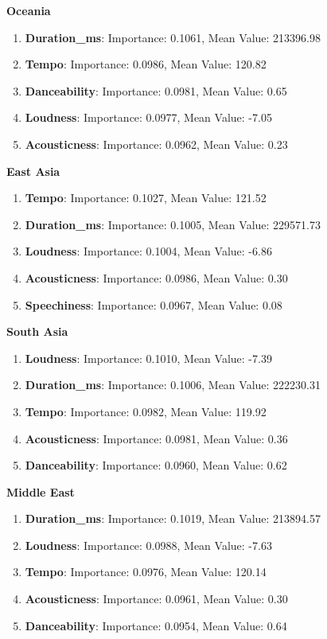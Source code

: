 \textbf{Oceania}
\begin{enumerate}
    \item \textbf{Duration\_ms}: Importance: 0.1061, Mean Value: 213396.98
    \item \textbf{Tempo}: Importance: 0.0986, Mean Value: 120.82
    \item \textbf{Danceability}: Importance: 0.0981, Mean Value: 0.65
    \item \textbf{Loudness}: Importance: 0.0977, Mean Value: -7.05
    \item \textbf{Acousticness}: Importance: 0.0962, Mean Value: 0.23
\end{enumerate}

\textbf{East Asia}
\begin{enumerate}
    \item \textbf{Tempo}: Importance: 0.1027, Mean Value: 121.52
    \item \textbf{Duration\_ms}: Importance: 0.1005, Mean Value: 229571.73
    \item \textbf{Loudness}: Importance: 0.1004, Mean Value: -6.86
    \item \textbf{Acousticness}: Importance: 0.0986, Mean Value: 0.30
    \item \textbf{Speechiness}: Importance: 0.0967, Mean Value: 0.08
\end{enumerate}

\textbf{South Asia}
\begin{enumerate}
    \item \textbf{Loudness}: Importance: 0.1010, Mean Value: -7.39
    \item \textbf{Duration\_ms}: Importance: 0.1006, Mean Value: 222230.31
    \item \textbf{Tempo}: Importance: 0.0982, Mean Value: 119.92
    \item \textbf{Acousticness}: Importance: 0.0981, Mean Value: 0.36
    \item \textbf{Danceability}: Importance: 0.0960, Mean Value: 0.62
\end{enumerate}


\textbf{Middle East}
\begin{enumerate}
    \item \textbf{Duration\_ms}: Importance: 0.1019, Mean Value: 213894.57
    \item \textbf{Loudness}: Importance: 0.0988, Mean Value: -7.63
    \item \textbf{Tempo}: Importance: 0.0976, Mean Value: 120.14
    \item \textbf{Acousticness}: Importance: 0.0961, Mean Value: 0.30
    \item \textbf{Danceability}: Importance: 0.0954, Mean Value: 0.64
\end{enumerate}


